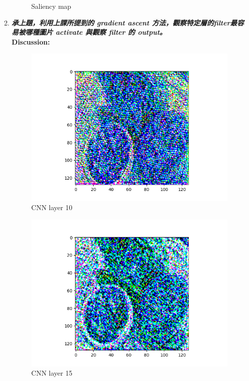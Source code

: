 \documentclass[a4paper,11pt]{article}
\begin{document}
\begin{enumerate}
\begin{figure}[htp]
\begin{center}
		    	\caption{Saliency map}
		    \end{center}
		\end{figure}
\newpage

	\item \textit{\textbf{承上題，利用上課所提到的 gradient ascent 方法，觀察特定層的filter最容易被哪種圖片 activate 與觀察 filter 的 output。}}\\

	\textbf{Discussion:}\\

		\begin{figure}[htp]
		    \begin{center}
		    		\includegraphics[scale=0.3]{./filter_layer_10.png}
		    	\caption{CNN layer 10}
		    \end{center}
		\end{figure}


		\begin{figure}[htp]
		    \begin{center}
		    		\includegraphics[scale=0.3]{./filter_layer_15.png}
		    	\caption{CNN layer 15}
		    \end{center}
		\end{figure}



\end{enumerate}
\end{document}
